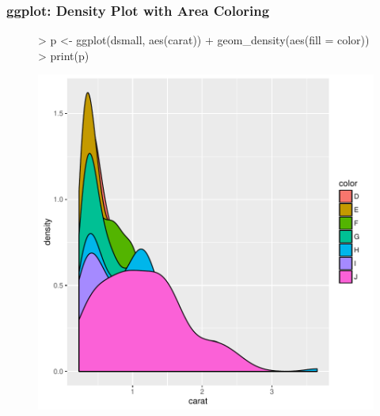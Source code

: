 \documentclass{beamer}
\begin{document}
\begin{frame}[containsverbatim]  
	\frametitle{ggplot: Density Plot with Area Coloring}
\scriptsize 
\begin{figure}
  \centering
\begin{Schunk}
\begin{Sinput}
> p <- ggplot(dsmall, aes(carat)) + geom_density(aes(fill = color))
> print(p) 
\end{Sinput}
\end{Schunk}
\includegraphics{fig--070}
\label{fig:qplotscatter}
\end{figure}
\end{frame}
\end{document}
